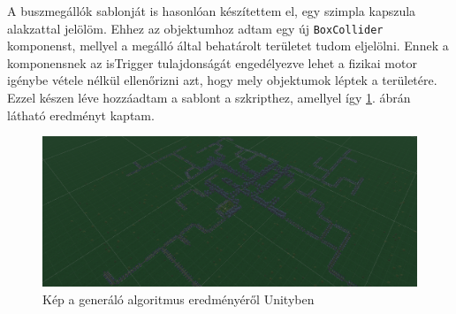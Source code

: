 A buszmegállók sablonját is hasonlóan készítettem el, egy szimpla kapszula alakzattal jelölöm. Ehhez az objektumhoz adtam egy új \texttt{BoxCollider} komponenst, mellyel a megálló által behatárolt területet tudom eljelölni. Ennek a komponensnek az isTrigger tulajdonságát engedélyezve lehet a fizikai motor igénybe vétele nélkül ellenőrizni azt, hogy mely objektumok léptek a területére. Ezzel készen léve hozzáadtam a sablont a szkripthez, amellyel így \ref{fig:ugraph}. ábrán látható eredményt kaptam.

\begin{figure}[H]
\includegraphics[width=\linewidth]{unitygraph.png}
\caption{Kép a generáló algoritmus eredményéről Unityben}
\label{fig:ugraph}
\end{figure}
